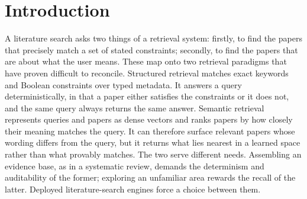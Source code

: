 
 
\section{Introduction}
\label{sec:intro}
 
A literature search asks two things of a retrieval system: firstly, to find the papers that precisely match a set of stated constraints; secondly, to find the papers that are about what the user means. These map onto two retrieval paradigms that have proven difficult to reconcile. Structured retrieval matches exact keywords and Boolean constraints over typed metadata. It answers a query deterministically, in that a paper either satisfies the constraints or it does not, and the same query always returns the same answer. Semantic retrieval represents queries and papers as dense vectors and ranks papers by how closely their meaning matches the query. It can therefore surface relevant papers whose wording differs from the query, but it returns what lies nearest in a learned space rather than what provably matches. The two serve different needs. Assembling an evidence base, as in a systematic review, demands the determinism and auditability of the former; exploring an unfamiliar area rewards the recall of the latter. Deployed literature-search engines force a choice between them.
 
